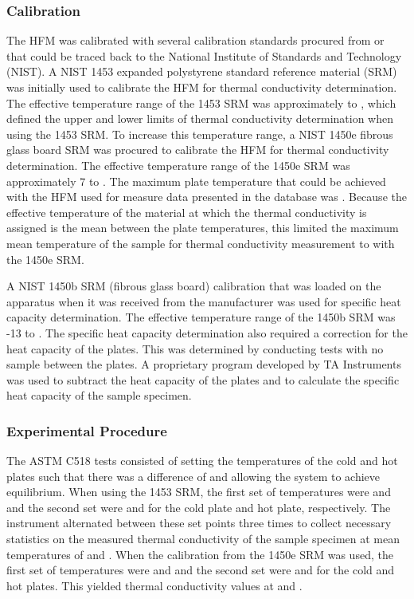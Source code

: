 \documentclass[12pt,oneside]{book}
\begin{document}
\subsubsection{Calibration}

The HFM was calibrated with several calibration standards procured from or that could be traced back to the National Institute of Standards and Technology (NIST). A NIST 1453 expanded polystyrene standard reference material (SRM) was initially used to calibrate the HFM for thermal conductivity determination. The effective temperature range of the 1453 SRM was approximately  to , which defined the upper and lower limits of thermal conductivity determination when using the 1453 SRM. To increase this temperature range, a NIST 1450e fibrous glass board SRM was procured to calibrate the HFM for thermal conductivity determination. The effective temperature range of the 1450e SRM was approximately 7 to . The maximum plate temperature that could be achieved with the HFM used for measure data presented in the database was . Because the effective temperature of the material at which the thermal conductivity is assigned is the mean between the plate temperatures, this limited the maximum mean temperature of the sample for thermal conductivity measurement to  with the 1450e SRM.

A NIST 1450b SRM (fibrous glass board) calibration that was loaded on the apparatus when it was received from the manufacturer was used for specific heat capacity determination. The effective temperature range of the 1450b SRM was -13 to . The specific heat capacity determination also required a correction for the heat capacity of the plates. This was determined by conducting tests with no sample between the plates. A proprietary program developed by TA Instruments was used to subtract the heat capacity of the plates and to calculate the specific heat capacity of the sample specimen. 

\subsubsection{Experimental Procedure}

The ASTM C518 tests consisted of setting the temperatures of the cold and hot plates such that there was a difference of  and allowing the system to achieve equilibrium. When using the 1453 SRM, the first set of temperatures were  and  and the second set were  and  for the cold plate and hot plate, respectively. The instrument alternated between these set points three times to collect necessary statistics on the measured thermal conductivity of the sample specimen at mean temperatures of  and . When the calibration from the 1450e SRM was used, the first set of temperatures were  and  and the second set were  and  for the cold and hot plates. This yielded thermal conductivity values at and .
\end{document}
